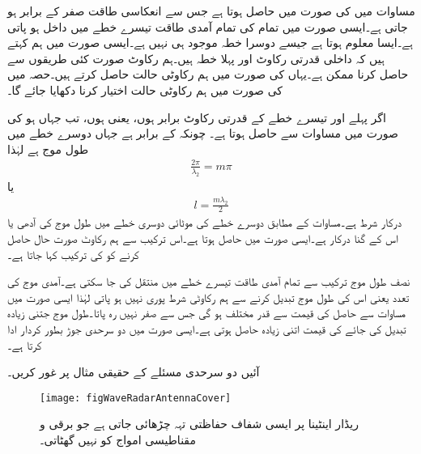 مساوات  میں  کی صورت میں  حاصل  ہوتا ہے جس سے انعکاسی طاقت صفر کے برابر ہو جاتی ہے۔ایسی صورت میں تمام کی تمام آمدی طاقت تیسرے خطے میں داخل ہو پاتی ہے۔ایسا معلوم ہوتا ہے جیسے دوسرا خطہ موجود ہی نہیں ہے۔ایسی صورت میں ہم کہتے ہیں کہ داخلی قدرتی رکاوٹ اور پہلا خطہ  ہیں۔ہم رکاوٹ صورت کئی طریقوں سے حاصل کرنا ممکن ہے۔یہاں  کی صورت میں ہم رکاوٹی حالت حاصل کرتے ہیں۔حصہ  میں  کی صورت میں ہم رکاوٹی حالت اختیار کرنا دکھایا جائے گا۔

اگر پہلے اور تیسرے خطے کے قدرتی رکاوٹ برابر ہوں، یعنی  ہوں، تب  جہاں  ہو کی صورت میں مساوات  سے   حاصل ہوتا ہے۔ چونکہ  کے برابر ہے جہاں  دوسرے خطے میں طول موج ہے لہٰذا
\begin{align*}
\frac{2 \pi}{\lambda_2}=m \pi
\end{align*}
یا
\begin{align}\label{مساوات_مستوی_دو_سرحدی_ہم_رکاوٹ_شرط}
l=\frac{m \lambda_2}{2}
\end{align}
درکار شرط ہے۔مساوات  کے مطابق دوسرے خطے کی موٹائی دوسری خطے میں طول موج کی آدھی یا اس کے  گنا درکار ہے۔ایسی صورت میں  حاصل ہوتا ہے۔اس ترکیب سے ہم رکاوٹ صورت حال حاصل کرنے کو  کی ترکیب کہا جاتا ہے۔

نصف طول موج ترکیب سے تمام آمدی طاقت تیسرے خطے میں منتقل کی جا سکتی ہے۔آمدی موج کی تعدد یعنی اس کی طول موج تبدیل کرنے سے ہم رکاوٹی شرط پوری نہیں ہو پاتی لہٰذا ایسی صورت میں مساوات  سے حاصل  کی قیمت  سے قدر مختلف ہو گی جس سے  صفر نہیں رہ پاتا۔طول موج جتنی زیادہ تبدیل کی جائے  کی قیمت اتنی زیادہ حاصل ہوتی ہے۔ایسی صورت میں دو سرحدی جوڑ بطور  کردار ادا کرتا ہے۔

آئیں دو سرحدی مسئلے کے حقیقی مثال پر غور کریں۔

\begin{figure}
\centering
\texttt{[image: figWaveRadarAntennaCover]}
\caption{ریڈار اینٹینا پر ایسی شفاف حفاظتی تہہ چڑھائی جاتی ہے جو برقی و مقناطیسی امواج کو نہیں گھٹاتی۔}
\label{شکل_موج_ریڈار_اینٹینا_تہہ}
\end{figure}

